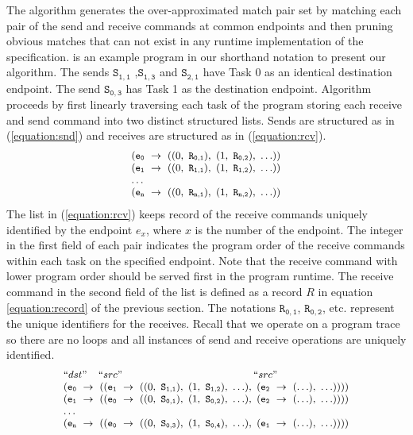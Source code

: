 The algorithm generates the over-approximated match pair set by matching each pair of the send and receive commands at common endpoints and then pruning obvious matches that can not exist in any runtime implementation of the specification.  is an example program in our shorthand notation to present our algorithm. The sends $\mathtt{S_{1,1}}$ ,$\mathtt{S_{1,3}}$ and $\mathtt{S_{2,1}}$ have Task 0 as an identical destination endpoint. The send $\mathtt{S_{0,3}}$ has Task 1 as the destination endpoint.
Algorithm proceeds by first linearly traversing each task of the program storing each receive and send command into two distinct structured lists. Sends are structured as in (\ref{equation:snd}) and receives are structured as in (\ref{equation:rcv}).
\begin{equation}
\footnotesize \begin{array}{l}
(\mathtt{e_0}\ \rightarrow\ ((0,\ \mathtt{R_{0,1}}),\ (1,\ \mathtt{R_{0,2}}),\ \ldots))\\
(\mathtt{e_1}\ \rightarrow\ ((0,\ \mathtt{R_{1,1}}),\ (1,\ \mathtt{R_{1,2}}),\ \ldots))\\
\ldots \\
(\mathtt{e_n}\ \rightarrow\ ((0,\ \mathtt{R_{n,1}}),\ (1,\ \mathtt{R_{n,2}}),\ \ldots))\\
\end{array}
\label{equation:rcv}
\end{equation}
The list in (\ref{equation:rcv}) keeps record of the receive commands uniquely identified by the endpoint $\mathit{e}_x$, where $x$ is the number of the endpoint. The integer in the first field of each pair indicates the program order of the receive commands within each task on the specified endpoint. Note that the receive command with lower program order should be served first in the program runtime. The receive command in the second field of the list is defined as a record $R$ in equation \ref{equation:record} of the previous section. The notations $\mathtt{R_{0,1}}$, $\mathtt{R_{0,2}}$, etc. represent the unique identifiers for the receives. Recall that we operate on a program trace so there are no loops and all instances of send and receive operations are uniquely identified.
\begin{equation}
\footnotesize \begin{array}{l}
 ``dst" \;\;\;\; ``src" \;\;\;\;\;\;\;\;\;\;\;\;\;\;\;\;\;\;\;\;\;\;\;\;\;\;\;\;\;\;\;\;\;\;\;\;\;\;\;\;\;\;\;\;\;\; ``src"\\
(\mathtt{e_0}\ \rightarrow\ ((\mathtt{e_1}\ \rightarrow\ ((0,\ \mathtt{S_{1,1}}),\ (1,\ \mathtt{S_{1,2}}),\ \ldots),\ (\mathtt{e_2}\ \rightarrow\ (\ldots),\ \ldots))))\\
(\mathtt{e_1}\ \rightarrow\ ((\mathtt{e_0}\ \rightarrow\ ((0,\ \mathtt{S_{0,1}}),\ (1,\ \mathtt{S_{0,2}}),\ \ldots),\ (\mathtt{e_2}\ \rightarrow\ (\ldots),\ \ldots))))\\
 \dots\\
(\mathtt{e_n}\ \rightarrow\ ((\mathtt{e_0}\ \rightarrow\ ((0,\ \mathtt{S_{0,3}}),\ (1,\ \mathtt{S_{0,4}}),\ \ldots),\ (\mathtt{e_1}\ \rightarrow\ (\ldots),\ \ldots))))\\
\end{array}
\label{equation:snd}
\end{equation}
